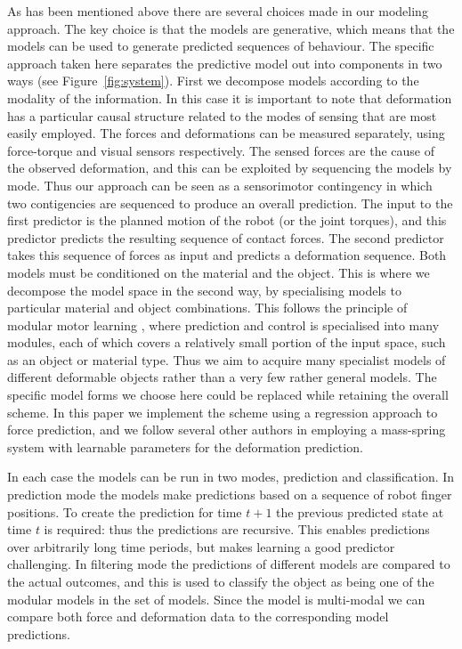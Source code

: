 \documentclass[journal]{IEEEtran}
\begin{document}
As has been mentioned above there are several choices made in our modeling approach. The key choice is that the models are generative, which means that the models can be used to generate predicted sequences of behaviour. The specific approach taken here separates the predictive model out into components in two ways (see Figure~\ref{fig:system}). First we decompose models according to the modality of the information. In this case it is important to note that deformation has a particular causal structure related to the modes of sensing that are most easily employed. The forces and deformations can be measured separately, using force-torque and visual sensors respectively. The sensed forces are the cause of the observed deformation, and this can be exploited by sequencing the models by mode. Thus our approach can be seen as a sensorimotor contingency in which two contigencies are sequenced to produce an overall prediction. The input to the first predictor is the planned motion of the robot (or the joint torques), and this predictor predicts the resulting sequence of contact forces. The second predictor takes this sequence of forces as input and predicts a deformation sequence. Both models must be conditioned on the material and the object. This is where we decompose the model space in the second way, by specialising models to particular material and object combinations. This follows the principle of modular motor learning \cite{kopickiwyatt16,haruno2001mosaic}, where prediction and control is specialised into many modules, each of which covers a relatively small portion of the input space, such as an object or material type. Thus we aim to acquire many specialist models of different deformable objects rather than a very few rather general models. The specific model forms we choose here could be replaced while retaining the overall scheme. In this paper we implement the scheme using a regression approach to force prediction, and we follow several other authors in employing a mass-spring system with learnable parameters for the deformation prediction.

In each case the models can be run in two modes, prediction and classification. In prediction mode the models make predictions based on a sequence of robot finger positions. To create the prediction for time $t+1$ the previous predicted state at time $t$ is required: thus the predictions are recursive. This enables predictions over arbitrarily long time periods, but makes learning a good predictor challenging. In filtering mode the predictions of different models are compared to the actual outcomes, and this is used to classify the object as being one of the modular models in the set of models. Since the model is multi-modal we can compare both force and deformation data to the corresponding model predictions. 
\end{document}
